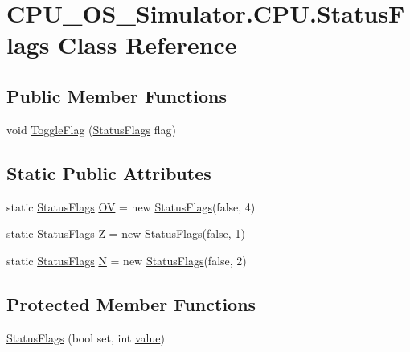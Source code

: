 \hypertarget{class_c_p_u___o_s___simulator_1_1_c_p_u_1_1_status_flags}{}\section{C\+P\+U\+\_\+\+O\+S\+\_\+\+Simulator.\+C\+P\+U.\+Status\+Flags Class Reference}
\label{class_c_p_u___o_s___simulator_1_1_c_p_u_1_1_status_flags}
\subsection*{Public Member Functions}
\begin{DoxyCompactItemize}
\item 
void \hyperlink{class_c_p_u___o_s___simulator_1_1_c_p_u_1_1_status_flags_a435d878793ab321ac1f2aae372c2e43e}{Toggle\+Flag} (\hyperlink{class_c_p_u___o_s___simulator_1_1_c_p_u_1_1_status_flags}{Status\+Flags} flag)
\end{DoxyCompactItemize}
\subsection*{Static Public Attributes}
\begin{DoxyCompactItemize}
\item 
static \hyperlink{class_c_p_u___o_s___simulator_1_1_c_p_u_1_1_status_flags}{Status\+Flags} \hyperlink{class_c_p_u___o_s___simulator_1_1_c_p_u_1_1_status_flags_ad4725b32f8d1718df7e6a1b6b4a21170}{O\+V} = new \hyperlink{class_c_p_u___o_s___simulator_1_1_c_p_u_1_1_status_flags}{Status\+Flags}(false, 4)
\item 
static \hyperlink{class_c_p_u___o_s___simulator_1_1_c_p_u_1_1_status_flags}{Status\+Flags} \hyperlink{class_c_p_u___o_s___simulator_1_1_c_p_u_1_1_status_flags_aa38943c12054a3f613161ecde5580f27}{Z} = new \hyperlink{class_c_p_u___o_s___simulator_1_1_c_p_u_1_1_status_flags}{Status\+Flags}(false, 1)
\item 
static \hyperlink{class_c_p_u___o_s___simulator_1_1_c_p_u_1_1_status_flags}{Status\+Flags} \hyperlink{class_c_p_u___o_s___simulator_1_1_c_p_u_1_1_status_flags_a48a766c8a99690112570b884b09e9b10}{N} = new \hyperlink{class_c_p_u___o_s___simulator_1_1_c_p_u_1_1_status_flags}{Status\+Flags}(false, 2)
\end{DoxyCompactItemize}
\subsection*{Protected Member Functions}
\begin{DoxyCompactItemize}
\item 
\hyperlink{class_c_p_u___o_s___simulator_1_1_c_p_u_1_1_status_flags_ab99e9cd2522d43a7dfd3224ff9ae0d79}{Status\+Flags} (bool set, int \hyperlink{class_c_p_u___o_s___simulator_1_1_c_p_u_1_1_status_flags_a289edb09fa9bef509188db5619be8dee}{value})
\end{DoxyCompactItemize}
